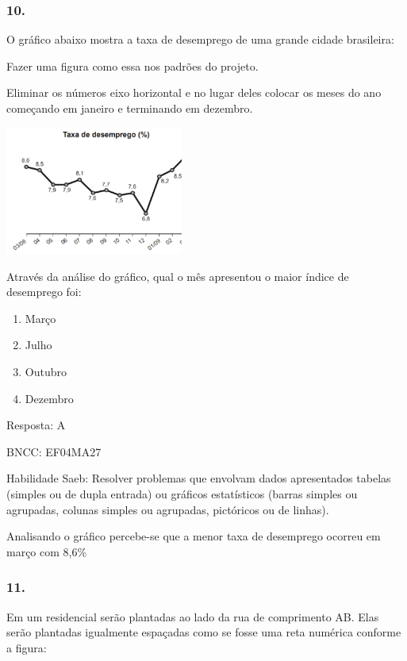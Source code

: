 \subsubsection{10.}\label{section-151}

O gráfico abaixo mostra a taxa de desemprego de uma grande cidade
brasileira:

Fazer uma figura como essa nos padrões do projeto.

Eliminar os números eixo horizontal e no lugar deles colocar os meses do
ano começando em janeiro e terminando em dezembro.

\includegraphics[width=2.29697in,height=1.66026in]{media/image146.png}

Através da análise do gráfico, qual o mês apresentou o maior índice de
desemprego foi:

\begin{enumerate}
\def\labelenumi{\alph{enumi})}
\item
  Março
\item
  Julho
\item
  Outubro
\item
  Dezembro
\end{enumerate}

Resposta: A

BNCC: EF04MA27

Habilidade Saeb: Resolver problemas que envolvam dados apresentados
tabelas (simples ou de dupla entrada) ou gráficos estatísticos (barras
simples ou agrupadas, colunas simples ou agrupadas, pictóricos ou de
linhas).

Analisando o gráfico percebe-se que a menor taxa de desemprego ocorreu
em março com 8,6\%

\subsubsection{11.}\label{section-152}

Em um residencial serão plantadas ao lado da rua de comprimento AB. Elas
serão plantadas igualmente espaçadas como se fosse uma reta numérica
conforme a figura:

